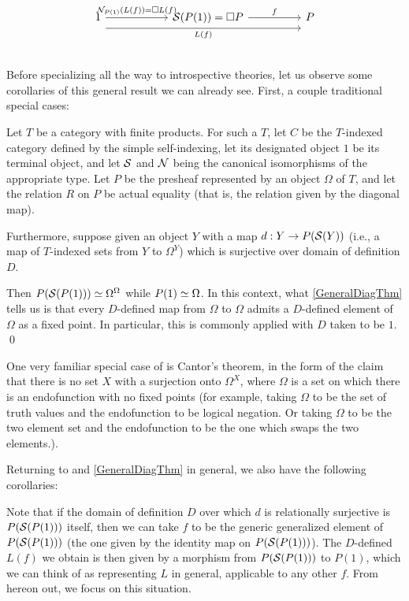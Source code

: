 \[\begin{tikzcd}
	1 & {} & {\introS(P(1)) = \Box P} && P \\
	& {}
	\arrow["{\introN_{P(1)}(L(f)) = \Box L(f)}", from=1-1, to=1-3]
	\arrow["f", from=1-3, to=1-5]
	\arrow["{L(f)}"', shift right=4, from=1-1, to=1-5]
\end{tikzcd}\]

Before specializing all the way to introspective theories, let us observe some corollaries of this general result we can already see. First, a couple traditional special cases:

\label{LawveresTheorem}
Let $T$ be a category with finite products. For such a $T$, let $C$ be the $T$-indexed category defined by the simple self-indexing, let its designated object $1$ be its terminal object, and let $\mathcal{S}$ and $\mathcal{N}$ being the canonical isomorphisms of the appropriate type. Let $P$ be the presheaf represented by an object $\Omega$ of $T$, and let the relation $R$ on $P$ be actual equality (that is, the relation given by the diagonal map). 

Furthermore, suppose given an object $Y$ with a map $d : Y \to P(\mathcal{S}(Y))$ (i.e., a map of $T$-indexed sets from $Y$ to $\Omega^Y$) which is surjective over domain of definition $D$.

Then $P(\mathcal{S}(P(1))) \simeq \Omega^{\Omega}$ while $P(1) \simeq \Omega$. In this context, what \cref{GeneralDiagThm} tells us is that every $D$-defined map from $\Omega$ to $\Omega$ admits a $D$-defined element of $\Omega$ as a fixed point. In particular, this is commonly applied with $D$ taken to be $1$. \qed
{}

\label{CantorsTheorem}
One very familiar special case of  is Cantor's theorem, in the form of the claim that there is no set $X$ with a surjection onto $\Omega^X$, where $\Omega$ is a set on which there is an endofunction with no fixed points (for example, taking $\Omega$ to be the set of truth values and the endofunction to be logical negation. Or taking $\Omega$ to be the two element set and the endofunction to be the one which swaps the two elements.).

Returning to  and \cref{GeneralDiagThm} in general, we also have the following corollaries:

\begin{corollary}\label{RetractDiag}
Note that if the domain of definition $D$ over which $d$ is relationally surjective is $P(\mathcal{S}(P(1)))$ itself, then we can take $f$ to be the generic generalized element of $P(\mathcal{S}(P(1)))$ (the one given by the identity map on $P(\mathcal{S}(P(1)))$). The $D$-defined $L(f)$ we obtain is then given by a morphism from $P(\mathcal{S}(P(1)))$ to $P(1)$, which we can think of as representing $L$ in general, applicable to any other $f$. From hereon out, we focus on this situation.
\end{corollary}

